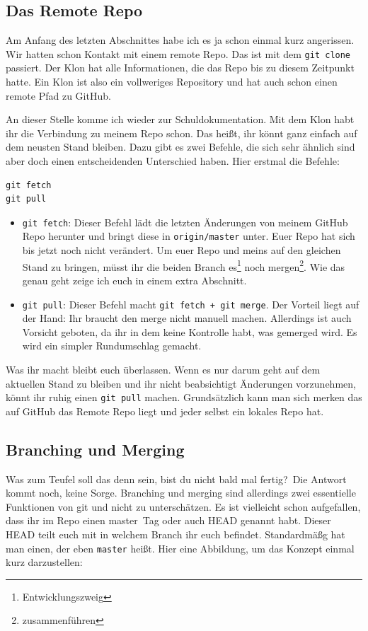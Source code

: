 \documentclass[a4paper,11pt]{scrartcl}	%
\begin{document}
	\subsection{Das Remote Repo}
	Am Anfang des letzten Abschnittes habe ich es ja schon einmal kurz angerissen. Wir hatten schon Kontakt mit einem
	remote Repo. Das ist mit dem \texttt{git clone} passiert. Der Klon hat alle Informationen, die das Repo bis zu diesem
	Zeitpunkt hatte. Ein Klon ist also ein vollweriges Repository und hat auch schon einen remote Pfad zu GitHub.\par
	An dieser Stelle komme ich wieder zur Schuldokumentation. Mit dem Klon habt ihr die Verbindung zu meinem Repo schon.
	Das heißt, ihr könnt ganz einfach auf dem neusten Stand bleiben. Dazu gibt es zwei Befehle, die sich sehr ähnlich sind
	aber doch einen entscheidenden Unterschied haben. Hier erstmal die Befehle:

		\begin{lstlisting}[frame=single]
git fetch
git pull
		\end{lstlisting}

		\begin{itemize}
			\item \texttt{git fetch}: Dieser Befehl lädt die letzten Änderungen von meinem GitHub Repo herunter
				und bringt diese in \texttt{origin/master} unter. Euer Repo hat sich bis jetzt noch nicht
				verändert. Um euer Repo und meins auf den gleichen Stand zu bringen, müsst ihr die beiden Branch
				es\footnote{Entwicklungszweig} noch mergen\footnote{zusammenführen}. Wie das genau geht zeige
				ich euch in einem extra Abschnitt.
			\item \texttt{git pull}: Dieser Befehl macht \texttt{git fetch + git merge}. Der Vorteil liegt auf der
				Hand: Ihr braucht den merge nicht manuell machen. Allerdings ist auch Vorsicht geboten, da ihr
				in dem keine Kontrolle habt, was gemerged wird. Es wird ein simpler Rundumschlag gemacht.
		\end{itemize}

	Was ihr macht bleibt euch überlassen. Wenn es nur darum geht auf dem aktuellen Stand zu bleiben und ihr nicht 
	beabsichtigt Änderungen vorzunehmen, könnt ihr ruhig einen \texttt{git pull} machen. Grundsätzlich kann man sich merken
	das auf GitHub das Remote Repo liegt und jeder selbst ein lokales Repo hat.

	\subsection{Branching und Merging}
	\glqq Was zum Teufel soll das denn sein, bist du nicht bald mal fertig?\grqq\ Die Antwort kommt noch, keine Sorge.
	Branching und merging sind allerdings zwei essentielle Funktionen von git und nicht zu unterschätzen.
	Es ist vielleicht schon aufgefallen, dass ihr im Repo einen \glqq master\grqq\ Tag oder auch HEAD genannt habt.
	Dieser HEAD teilt euch mit in welchem Branch ihr euch befindet. Standardmäßg hat man einen, der eben \texttt{master}
	heißt. Hier eine Abbildung, um das Konzept einmal kurz darzustellen:
\end{document}
